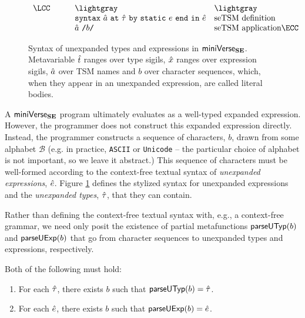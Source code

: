 \begin{figure}
\[\begin{array}{lllllll}
\LCC  &  & 
& \lightgray & \lightgray \\
&&
& \uesyntax{\tsmv}{\utau}{e}{\ue} & \text{seTSM definition}\\ 
&&
& \utsmap{\tsmv}{b} & \text{seTSM application}\ECC
\end{array}\]
\caption[Syntax of unexpanded types and expressions in $\miniVerseUE$]{Syntax of unexpanded types and expressions in $\miniVerseUE$. Metavariable ${\hat{t}}$ ranges over type sigils, ${\hat x}$ ranges over expression sigils, $\hat{a}$  over TSM names and $b$ over character sequences, which, when they appear in an unexpanded expression, are called literal bodies.}
\label{fig:U-unexpanded-terms}
\end{figure}
A $\miniVerseUE$ program ultimately evaluates as a well-typed expanded expression. However, the programmer does not construct this expanded expression directly. Instead, the programmer constructs a sequence of characters, $b$, drawn from some alphabet $\mathcal{B}$ (e.g. in practice, \texttt{ASCII} or \texttt{Unicode} -- the particular choice of alphabet is not important, so we leave it abstract.) This sequence of characters must be well-formed according to the context-free textual syntax of \emph{unexpanded expressions}, ${\hat e}$. Figure \ref{fig:U-unexpanded-terms} defines the stylized syntax for unexpanded expressions and the \emph{unexpanded types}, ${\hat\tau}$, that they can contain.

Rather than defining the context-free textual syntax with, e.g., a context-free grammar, we need only posit the existence of partial metafunctions $\mathsf{parseUTyp}(b)$ and $\mathsf{parseUExp}(b)$  that go from character sequences to unexpanded types and expressions, respectively. 
\begin{condition} Both of the following must hold:
\begin{enumerate}
\item For each ${\hat\tau}$, there exists $b$ such that $\mathsf{parseUTyp}(b)={\hat\tau}$. 
\item For each ${\hat e}$, there exists $b$ such that $\mathsf{parseUExp}(b)={\hat e}$.
\end{enumerate}
\end{condition}

